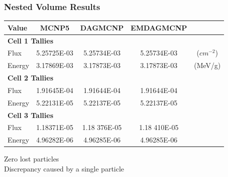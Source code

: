 \documentclass[12pt]{beamer}
\begin{document}
\begin{frame}
\begin{center}
\end{center}

\end{frame}


\begin{frame}
\frametitle{Nested Volume Results}

\begin{table}
  \small
  \begin{center}
    \label{nestedspheres}
    \begin{tabular}{lcccc}
      \toprule
      Value & MCNP5 & DAGMCNP & EMDAGMCNP \\
      \toprule
      \multicolumn{4}{l}{\textbf{Cell 1 Tallies}} \\
      \hline
      Flux  & 5.25725E-03 & 5.25734E-03 & 5.25734E-03 & ($cm^{-2}$) \\
      Energy  & 3.17869E-03 &  3.17873E-03 &  3.17873E-03 & (MeV/g) \\
      \hline
      \multicolumn{4}{l}{\textbf{Cell 2 Tallies}} \\
      \hline
      Flux  & 1.91645E-04 & 1.91644E-04 & 1.91644E-04 \\
      Energy  & 5.22131E-05 & 5.22137E-05 & 5.22137E-05 \\
      \hline
      \multicolumn{4}{l}{\textbf{Cell 3 Tallies}} \\
      \hline
      Flux  & 1.18371E-05 & 1.18{\color{red} 376}E-05 & 1.18{\color{red} 410}E-05 \\
      Energy  & 4.96282E-06 & 4.96285E-06 & 4.96285E-06 \\
      \bottomrule
                        
    \end{tabular}
    \vfill
    Zero lost particles \\
    Discrepancy caused by a single particle \\

    
  \end{center}
\end{table}

\end{frame}
\end{document}
